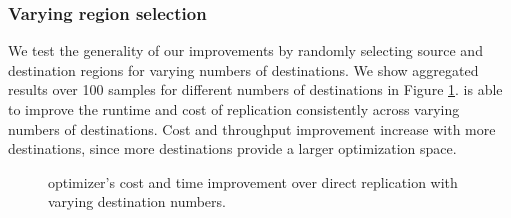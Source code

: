 \subsubsection{Varying region selection}
\label{random-ablation}
We test the generality of our improvements by randomly selecting source and destination regions for varying numbers of destinations. We show aggregated results over 100 samples for different numbers of destinations in Figure \ref{fig:dest_ablation}. \sys{} is able to improve the runtime and cost of replication consistently across varying numbers of destinations. Cost and throughput improvement increase with more destinations, since more destinations provide a larger optimization space. 





\begin{figure}[t]
\centering
{} 
\vspace{10pt} %
\caption{\sys{} optimizer's cost and time improvement over direct replication with varying destination numbers.} \label{fig:dest_ablation}
\end{figure}

